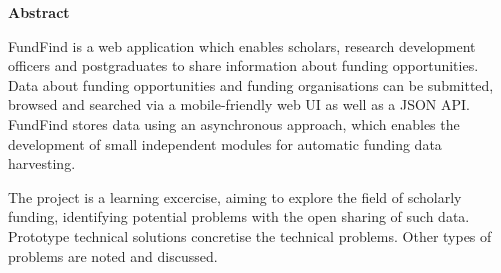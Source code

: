 \thispagestyle{empty}

\begin{center}
    {\LARGE\bf Abstract}
\end{center}

FundFind is a web application which enables scholars, research development officers and postgraduates to share information about funding opportunities. Data about funding opportunities and funding organisations can be submitted, browsed and searched via a mobile-friendly web UI as well as a JSON API. FundFind stores data using an asynchronous approach, which enables the development of small independent modules for automatic funding data harvesting.

The project is a learning excercise, aiming to explore the field of scholarly funding, identifying potential problems with the open sharing of such data. Prototype technical solutions concretise the technical problems. Other types of problems are noted and discussed.